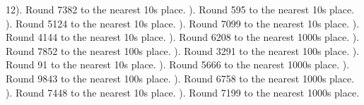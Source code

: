 \documentclass{article}%
\begin{document}
12). Round 7382 to the nearest 10s place.%
\newline%
\newline%
). Round 595 to the nearest 10s place.%
\newline%
\newline%
). Round 5124 to the nearest 10s place.%
\newline%
\newline%
). Round 7099 to the nearest 10s place.%
\newline%
\newline%
). Round 4144 to the nearest 10s place.%
\newline%
\newline%
). Round 6208 to the nearest 1000s place.%
\newline%
\newline%
). Round 7852 to the nearest 100s place.%
\newline%
\newline%
). Round 3291 to the nearest 100s place.%
\newline%
\newline%
). Round 91 to the nearest 10s place.%
\newline%
\newline%
). Round 5666 to the nearest 1000s place.%
\newline%
\newline%
). Round 9843 to the nearest 100s place.%
\newline%
\newline%
). Round 6758 to the nearest 1000s place.%
\newline%
\newline%
). Round 7448 to the nearest 10s place.%
\newline%
\newline%
). Round 7199 to the nearest 1000s place.%
\newline%
\end{document}
